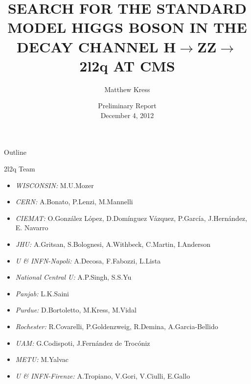 \documentclass{beamer}
\title[H$\rightarrow$ZZ$\rightarrow$2l2q] %
{SEARCH FOR THE STANDARD MODEL HIGGS BOSON IN THE DECAY CHANNEL H$\rightarrow$ZZ$\rightarrow$2l2q AT CMS}
\author[Matthew Kress] %
{Matthew Kress}
\institute[Purdue University] %
\date[September 28, 2012] %
{Preliminary Report%
\\
December 4, 2012
}
\begin{document}
\begin{frame}
  \titlepage
\end{frame}

\begin{frame}{Outline}
  \tableofcontents
\end{frame}




\begin{frame}{2l2q Team}
  \begin{itemize}
    \footnotesize
  \item
    \emph{\color{red} WISCONSIN:} M.U.Mozer
  \item
    \emph{\color{red} CERN:} A.Bonato, P.Lenzi, M.Mannelli	
  \item
    \emph{\color{red} CIEMAT:} O.Gonz\'{a}lez L\'{o}pez, D.Dom\'{i}nguez V\'{a}zquez, P.Garc\'{i}a, J.Hern\'{a}ndez, E. Navarro
  \item
    \emph{\color{red} JHU:} A.Gritsan, S.Bolognesi, A.Withbeck, C.Martin, I.Anderson
  \item
    \emph{\color{red} U \& INFN-Napoli:} A.Decosa, F.Fabozzi, L.Lista
  \item
    \emph{\color{red} National Central U:} A.P.Singh, S.S.Yu
  \item
    \emph{\color{red} Panjab:} L.K.Saini
  \item
    \emph{\color{red} Purdue:} D.Bortoletto, M.Kress, M.Vidal
  \item
    \emph{\color{red} Rochester:} R.Covarelli, P.Goldenzweig, R.Demina, A.Garcia-Bellido
  \item
    \emph{\color{red} UAM:} G.Codispoti, J.Fern\'{a}ndez de Troc\'{o}niz
  \item
    \emph{\color{red} METU:} M.Yalvac
  \item
    \emph{\color{red} U \& INFN-Firenze:} A.Tropiano, V.Gori, V.Ciulli, E.Gallo

    
  \end{itemize}
\end{frame}
\end{document}
